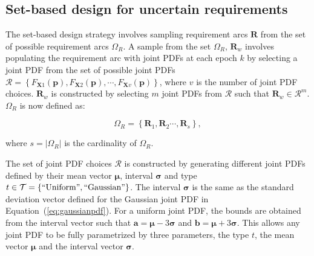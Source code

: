 \subsection{Set-based design for uncertain requirements} \label{subsec:SBDproblem}


The set-based design strategy involves sampling requirement arcs $\mathbf{R}$ from the set of possible requirement arcs $\Omega_R$. A sample from the set $\Omega_R$, $\mathbf{R}_w$ involves populating the requirement arc with joint \acp{PDF} at each epoch $k$ by selecting a joint \ac{PDF} from the set of possible joint \acp{PDF} $\mathcal{R} = \left\{F_{\mathbf{X}1}(\mathbf{p}),F_{\mathbf{X}2}(\mathbf{p}),\cdots,F_{\mathbf{X}v}(\mathbf{p})\right\}$, where $v$ is the number of joint \ac{PDF} choices. $\mathbf{R}_w$ is constructed by selecting $m$ joint \acp{PDF} from $\mathcal{R}$ such that $\mathbf{R}_w \in \mathcal{R}^m$. $\Omega_R$ is now defined as:

\begin{equation} \label{eq:Rarcsample}
	\Omega_R = \left\{\mathbf{R}_1,\mathbf{R}_2\cdots,\mathbf{R}_s\right\},
\end{equation}

where $s = |\Omega_R|$ is the cardinality of $\Omega_R$.

The set of joint \ac{PDF} choices $\mathcal{R}$ is constructed by generating different joint \acp{PDF} defined by their mean vector $\boldsymbol{\mu}$, interval $\boldsymbol{\sigma}$ and type $t\in\mathcal{T} = \left\{\mathrm{``Uniform"},\mathrm{``Gaussian"}\right\}$. The interval $\boldsymbol{\sigma}$ is the same as the standard deviation vector defined for the Gaussian joint \ac{PDF} in Equation~(\ref{eq:gaussianpdf}). For a uniform joint \ac{PDF}, the bounds are obtained from the interval vector such that $\mathbf{a} = \boldsymbol{\mu} - 3\boldsymbol{\sigma}$ and $\mathbf{b} = \boldsymbol{\mu} + 3\boldsymbol{\sigma}$. This allows any joint \ac{PDF} to be fully parametrized by three parameters, the type $t$, the mean vector $\boldsymbol{\mu}$ and the interval vector $\boldsymbol{\sigma}$.

